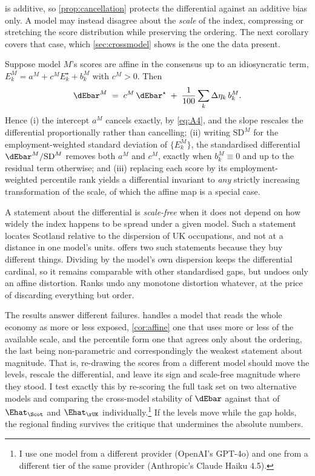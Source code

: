 \noindent
{} is additive, so \cref{prop:cancellation} protects the differential against an additive bias only. A model may instead disagree about the \emph{scale} of the index, compressing or stretching the score distribution while preserving the ordering. The next corollary covers that case, which \cref{sec:crossmodel} shows is the one the data present.

\begin{corollary}\label{cor:affine}
Suppose model $M$'s scores are affine in the consensus up to an idiosyncratic term,
$E^{M}_k = a^{M} + c^{M} E^{\star}_k + b^{M}_k$ with $c^{M} > 0$. Then
\begin{equation}\label{eq:cor2}
\dEbar^{M} \;=\; c^{M}\, \dEbar^{\star} \;+\;
\frac{1}{100} \sum_k \Delta\eta_k\, b^{M}_k .
\end{equation}
Hence (i) the intercept $a^{M}$ cancels exactly, by \cref{eq:A4}, and the slope rescales the differential proportionally rather than cancelling; (ii) writing $\mathrm{SD}^{M}$ for the employment-weighted standard deviation of $\{E^{M}_k\}$, the standardised differential $\dEbar^{M}/\mathrm{SD}^{M}$ removes both $a^{M}$ and $c^{M}$, exactly when $b^{M}_k \equiv 0$ and up to the residual term otherwise; and (iii) replacing each score by its employment-weighted percentile rank yields a differential invariant to \emph{any} strictly increasing transformation of the scale, of which the affine map is a special case.
\end{corollary}

\noindent
A statement about the differential is \emph{scale-free} when it does not depend on how widely the index happens to be spread under a given model. Such a statement locates Scotland relative to the dispersion of UK occupations, and not at a distance in one model's units.  offers two such statements because they buy different things. Dividing by the model's own dispersion keeps the differential cardinal, so it remains comparable with other standardised gaps, but undoes only an affine distortion. Ranks undo any monotone distortion whatever, at the price of discarding everything but order.

The results answer different failures.  handles a model that reads the whole economy as more or less exposed, \cref{cor:affine} one that uses more or less of the available scale, and the percentile form one that agrees only about the ordering, the last being non-parametric and correspondingly the weakest statement about magnitude. That is, re-drawing the scores from a different model should move the levels, rescale the differential, and leave its sign and scale-free magnitude where they stood. I test exactly this by re-scoring the full task set on two alternative models and comparing the cross-model stability of $\dEbar$ against that of $\Ehat_{\Scot}$ and $\Ehat_{\rUK}$ individually.\footnote{I use one model from a different provider (OpenAI's GPT-4o) and one from a different tier of the same provider (Anthropic's Claude Haiku 4.5).} If the levels move while the gap holds, the regional finding survives the critique that undermines the absolute numbers.

